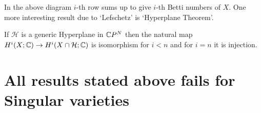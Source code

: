 \documentclass[11pt]{article}
\begin{document}
\noindent In the above diagram $i$-th row sums up to give $i$-th Betti numbers of $X$. One more interesting result due to `Lefschetz' is `Hyperplane Theorem'.

\begin{Thm}{}{}
    If $\mathcal{H}$ is a generic Hyperplane in $\mathbb{C} P^N$ then the natural map $H^i(X;\mathbb{C}) \to H^i(X\cap \mathcal{H};\mathbb{C})$ is isomorphism for $i<n$ and for $i=n$ it is injection. 
\end{Thm}

\section{All results stated above fails for Singular varieties}
\end{document}

